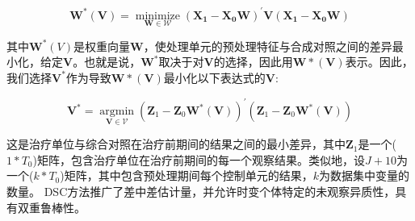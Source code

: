 \begin{equation}
    \mathbf{W^{*}(V)}=\underset{\mathbf{W} \in \mathcal{W}}{\operatorname{minimize}}\left(\mathbf{X}_{\mathbf{1}}-\mathbf{X}_{\mathbf{0}} \mathbf{W}\right)^{\prime} \mathbf{V}\left(\mathbf{X}_{\mathbf{1}}-\mathbf{X}_{\mathbf{0}} \mathbf{W}\right)
\end{equation}

其中$\mathbf{W}^{*}(V)$是权重向量$\mathbf{W}$，使处理单元的预处理特征与合成对照之间的差异最小化，给定$\mathbf{V}$。也就是说，$\mathbf{W^{*}}$取决于对$\mathbf{V}$的选择，因此用$\mathbf{W*(V)}$表示。因此，我们选择$\mathbf{V^{*}}$作为导致$\mathbf{W*(V)}$最小化以下表达式的$\mathbf{V}$:

\begin{equation}
    \mathbf{V}^{*}=\underset{\mathbf{V} \in \mathcal{V}}{\operatorname{argmin}}\left(\mathbf{Z}_{1}-\mathbf{Z}_{0} \mathbf{W}^{*}(\mathbf{V})\right)^{\prime}\left(\mathbf{Z}_{1}-\mathbf{Z}_{0} \mathbf{W}^{*}(\mathbf{V})\right)
\end{equation}

这是治疗单位与综合对照在治疗前期间的结果之间的最小差异，其中$\mathbf{Z}_{1}$是一个($1*T_0$)矩阵，包含治疗单位在治疗前期间的每一个观察结果。类似地，设$J+1$0为一个($k * T_0$)矩阵，其中包含预处理期间每个控制单元的结果，$k$为数据集中变量的数量。
DSC方法推广了差中差估计量，并允许时变个体特定的未观察异质性，具有双重鲁棒性\cite{billmeier2013, smith2015}。





